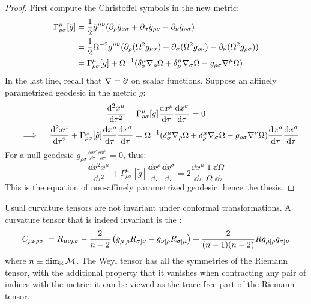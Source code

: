 \begin{proofbox}
  \begin{proof}
    First compute the Christoffel symbols in the new metric:
    \begin{equation*}
      \begin{split}
        \Gamma^\mu_{\rho \sigma}[\tilde{g}]
        &= \frac{1}{2} \tilde{g}^{\mu \nu} (\partial_\rho \tilde{g}_{\nu \sigma} + \partial_\sigma \tilde{g}_{\rho \nu} - \partial_\nu \tilde{g}_{\rho \sigma}) \\
        &= \frac{1}{2} \Omega^{-2} g^{\mu \nu} (\partial_\rho (\Omega^2 g_{\nu \sigma}) + \partial_\sigma (\Omega^2 g_{\rho \nu}) - \partial_\nu (\Omega^2 g_{\rho \sigma})) \\
        &= \Gamma^\mu_{\rho \sigma}[g] + \Omega^{-1} (\delta^\mu_\sigma \nabla_\rho \Omega + \delta^\mu_\rho \nabla_\sigma \Omega - g_{\rho \sigma} \nabla^\mu \Omega)
      \end{split}
    \end{equation*}
    In the last line, recall that $ \nabla = \partial $ on scalar functions. Suppose an affinely parametrized geodesic in the metric $ g $:
    \begin{multline*}
      \frac{\mathrm{d}^2 x^\mu}{\mathrm{d} \tau^2} + \Gamma^\mu_{\rho \sigma}[g] \frac{\mathrm{d} x^\rho}{\mathrm{d} \tau} \frac{\mathrm{d} x^\sigma}{\mathrm{d} \tau} = 0 \\
      \quad \implies \quad
      \frac{\mathrm{d}^2 x^\mu}{\mathrm{d} \tau^2} + \Gamma^\mu_{\rho \sigma}[\tilde{g}] \frac{\mathrm{d} x^\rho}{\mathrm{d} \tau} \frac{\mathrm{d} x^\sigma}{\mathrm{d} \tau} = \Omega^{-1} (\delta^\mu_\sigma \nabla_\rho \Omega + \delta^\mu_\rho \nabla_\sigma \Omega - g_{\rho \sigma} \nabla^\nu \Omega) \frac{\mathrm{d} x^\rho}{\mathrm{d} \tau} \frac{\mathrm{d} x^\sigma}{\mathrm{d} \tau}
    \end{multline*}
    For a null geodesic $ g_{\rho \sigma} \frac{\dd x^\rho}{\dd \tau} \frac{\dd x^\sigma}{\dd \tau} = 0 $, thus:
    \begin{equation*}
      \frac{\dd x^2 x^\mu}{\dd \tau^2} + \Gamma^\mu_{\rho \sigma}[\tilde{g}] \frac{\dd x^\rho}{\dd \tau} \frac{\dd x^\sigma}{\dd \tau} = 2 \frac{\dd x^\mu}{\dd \tau} \frac{1}{\Omega} \frac{\dd \Omega}{\dd \tau}
    \end{equation*}
    This is the equation of non-affinely parametrized geodesic, hence the thesis.
  \end{proof}
\end{proofbox}

Usual curvature tensors are not invariant under conformal transformations. A curvature tensor that is indeed invariant is the :
\begin{equation}
  C_{\mu \nu \rho \sigma} \defeq R_{\mu \nu \rho \sigma} - \frac{2}{n - 2} \left( g_{\mu [\rho} R_{\sigma] \nu} - g_{\nu [\rho} R_{\sigma] \mu} \right) + \frac{2}{(n-1)(n-2)} R g_{\mu [\rho} g_{\sigma] \nu}
\end{equation}
where $ n \equiv \dim_{\mathbb{R}}\mathcal{M} $. The Weyl tensor has all the symmetries of the Riemann tensor, with the additional property that it vanishes when contracting any pair of indices with the metric: it can be viewed as the trace-free part of the Riemann tensor.

